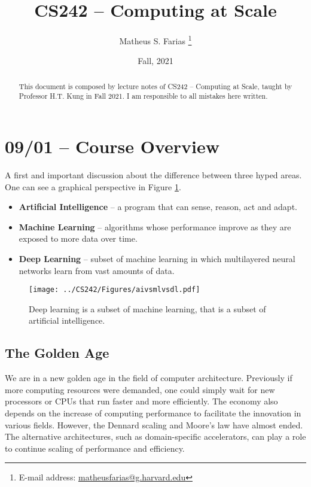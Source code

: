 \documentclass[abstract=true]{scrartcl}
\begin{document}
\title{CS242 -- Computing at Scale}
\date{Fall, 2021}

\author{Matheus S. Farias%
  \thanks{E-mail address: \href{mailto:matheusfarias@g.harvard.edu}{matheusfarias@g.harvard.edu}}}

\maketitle

\begin{abstract}
    This document is composed by lecture notes of CS242 -- Computing at Scale, taught by Professor H.T. Kung in Fall 2021. I am responsible to all mistakes here written.
\end{abstract}

\tableofcontents

\section{09/01 -- Course Overview}
A first and important discussion about the difference between three hyped areas. One can see a graphical perspective in Figure  \ref{fig:aivsmlvsdl}.  
\begin{itemize}
    \item \textbf{Artificial Intelligence} -- a program that can sense, reason, act and adapt.
    \item \textbf{Machine Learning} -- algorithms whose performance improve as they are exposed to more data over time.
    \item \textbf{Deep Learning} -- subset of machine learning in which multilayered neural networks learn from vast amounts of data.
\end{itemize}

\begin{figure}
    \centering
    \texttt{[image: ../CS242/Figures/aivsmlvsdl.pdf]}
    \caption{Deep learning is a subset of machine learning, that is a subset of artificial intelligence.}
    \label{fig:aivsmlvsdl}
\end{figure}

\subsection{The Golden Age}
We are in a new golden age in the field of computer architecture. Previously if more computing resources were demanded, one could simply wait for new processors or CPUs that run faster and more efficiently. The economy also depends on the increase of computing performance to facilitate the innovation in various fields. However, the Dennard scaling and Moore’s law have almost ended. The alternative architectures, such as domain-specific accelerators, can play a role to continue scaling of performance and efficiency.
\end{document}
